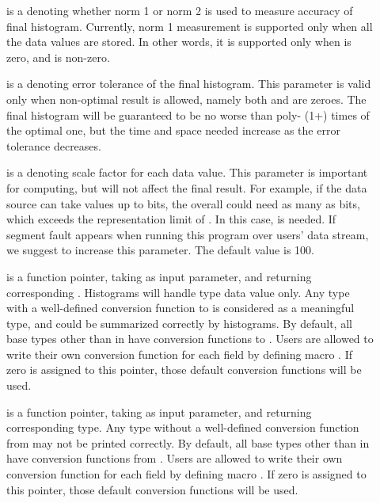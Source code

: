 \begin{description}
\item[] is a  denoting whether norm 1 or norm 2
  is used to measure accuracy of final histogram. Currently, norm 1
  measurement is supported only when all the data values are
  stored. In other words, it is supported only when  is
  zero, and  is non-zero. 

\item[] is a  denoting error tolerance of the
  final histogram. This parameter is valid only when non-optimal
  result is allowed, namely both  and  are
  zeroes. The final histogram will be guaranteed to be no worse than
  poly- (1+) times of the optimal one, but the time and
  space needed increase as the error tolerance decreases.  

\item[] is a  denoting scale factor for
  each data value. This parameter is important for computing, but will
  not affect the final result. For example, if the data source can
  take values up to  bits, the overall  could need
  as many as  bits, which exceeds the representation limit of
  \pads{}. In this case,  is needed. If segment fault
  appears when running this program over users' data stream, we
  suggest to increase this parameter.  The default value is 100.       

\item[] is a function pointer, taking
   as input parameter, and returning corresponding
  . Histograms will handle  type data value 
  only. Any type with a well-defined conversion function to
   is considered as a meaningful type, and could be summarized
  correctly by histograms. By default, all base types other than  in \pads{} have
  conversion functions to . Users are allowed to write their
  own conversion function for each field by defining macro . If zero is assigned to this pointer, those default
  conversion functions will be used.
   
\item[] is a function pointer, taking
   as input parameter, and returning corresponding
   type. Any type without a well-defined conversion
  function from  may not be printed correctly. By
  default, all base types other than  in \pads{} have
  conversion functions from . Users are allowed to write their
  own conversion function for each field by defining macro . If zero is assigned to this pointer, those default
  conversion functions will be used.

\end{description}

